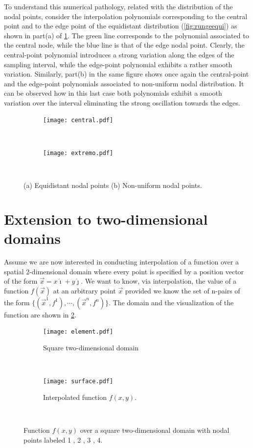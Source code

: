 To understand this numerical pathology, related with the distribution of the nodal points, consider the interpolation polynomials corresponding to the central point and to the edge point of the equidistant distribution (\cref{fig:rungeequi}) as shown in part(a) of \cref{fig:compara}. The green line corresponds to the polynomial associated to the central node, while the blue line is that of the edge nodal point. Clearly, the central-point polynomial introduces a strong variation along the edges of the sampling interval, while the edge-point polynomial exhibits a rather smooth variation. Similarly, part(b) in the same figure shows once again the central-point and the edge-point polynomials associated to non-uniform nodal distribution. It can be observed how in this last case both polynomials exhibit a smooth variation over the interval eliminating the strong oscillation towards the edges.

\begin{figure}[H]
\centering
	\begin{subfigure}[b]{0.45\textwidth}\qquad
		\texttt{[image: central.pdf]}
		\caption{}
	\end{subfigure}\,
%
	\begin{subfigure}[b]{0.45\textwidth}\qquad
		\texttt{[image: extremo.pdf]}
		\caption{}
	\end{subfigure}\\

\caption{(a) Equidistant nodal points (b) Non-uniform nodal points.}
\label{fig:compara}
\end{figure}

\section{Extension to two-dimensional domains}
Assume we are now interested in conducting interpolation of a function over a spatial 2-dimensional domain where every point is specified by a position vector of the form $\overrightarrow x = x \hat{\imath} + y\hat{\jmath}$. We want to know, via interpolation, the value of a function $f(\overrightarrow x)$ at an arbitrary point $\overrightarrow x$ provided we know the set of n-pairs of the form $\{(\overrightarrow x ^1, f^1),\cdots,(\overrightarrow x ^n, f^n)\}$. The domain and the visualization of the function are shown in \cref{fig:element}.

\begin{figure}[H]
\centering
	\begin{subfigure}[b]{0.45\textwidth}\qquad
		\texttt{[image: element.pdf]}
		\caption{Square two-dimensional domain}
	\end{subfigure}\,
%
	\begin{subfigure}[b]{0.45\textwidth}\qquad
		\texttt{[image: surface.pdf]}
		\caption{Interpolated function $f(x,y)$.}
	\end{subfigure}\\

\caption{Function $f(x,y)$ over a square two-dimensional domain with nodal points labeled 1 , 2 , 3 , 4.}
\label{fig:element}
\end{figure}

